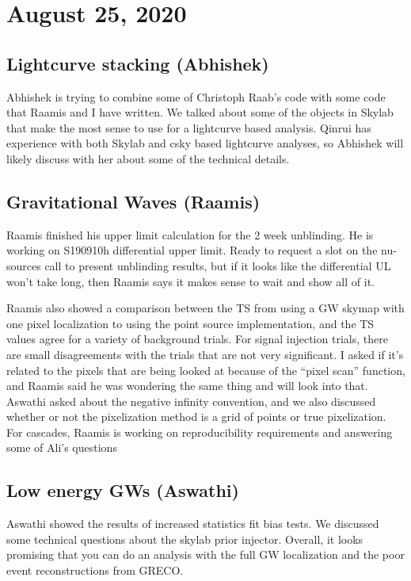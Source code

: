 \chapter{August 25, 2020}
\section{Lightcurve stacking (Abhishek)}
Abhishek is trying to combine some of Christoph Raab's code with some code that Raamis and I have written. We talked about some of the objects in Skylab that make the most sense to use for a lightcurve based analysis. Qinrui has experience with both Skylab and csky based lightcurve analyses, so Abhishek will likely discuss with her about some of the technical details.


\section{Gravitational Waves (Raamis)}
Raamis finished his upper limit calculation for the 2 week unblinding. He is working on S190910h differential upper limit. Ready to request a slot on the nu-sources call to present unblinding results, but if it looks like the differential UL won't take long, then Raamis says it makes sense to wait and show all of it.

Raamis also showed a comparison between the TS from using a GW skymap with one pixel localization to using the point source implementation, and the TS values agree for a variety of background trials. For signal injection trials, there are small disagreements with the trials that are not very significant. I asked if it's related to the pixels that are being looked at because of the ``pixel scan'' function, and Raamis said he was wondering the same thing and will look into that. Aswathi asked about the negative infinity convention, and we also discussed whether or not the pixelization method is a grid of points or true pixelization. For cascades, Raamis is working on reproducibility requirements and answering some of Ali's questions 
 

\section{Low energy GWs (Aswathi)}
Aswathi showed the results of increased statistics fit bias tests. We discussed some technical questions about the skylab prior injector. Overall, it looks promising that you can do an analysis with the full GW localization and the poor event reconstructions from GRECO. 


